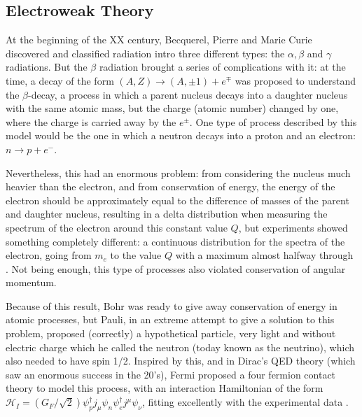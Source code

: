 
\subsection{Electroweak Theory} \label{EWT}

At the beginning of the XX century, Becquerel, Pierre and Marie Curie discovered and classified radiation intro three different types: the $\alpha, \beta$ and $\gamma$ radiations. But the $\beta$ radiation brought a series of complications with it: at the time, a decay of the form $(A, Z) \rightarrow (A, \pm 1) + e^{\mp}$ \cite{Haxton} was proposed to understand the $\beta$-decay,  a process in which a parent nucleus decays into a daughter nucleus with the same atomic mass, but the charge (atomic number) changed by one, where the charge is carried away by the $e^{\pm}$. One type of process described by this model would be the one in which a neutron decays into a proton and an electron: $n \rightarrow p + e^-$. 

Nevertheless, this had an enormous problem: from considering the nucleus much heavier than the electron, and from conservation of energy, the energy of the electron should be approximately equal to the difference of masses of the parent and daughter nucleus, resulting in a delta distribution when measuring the spectrum of the electron around this constant value $Q$, but experiments showed something completely different: a continuous distribution for the spectra of the electron, going from $m_e$ to the value $Q$ with a maximum almost halfway through \cite{Haxton}. Not being enough, this type of processes also violated conservation of angular momentum.

Because of this result, Bohr was ready to give away conservation of energy in atomic processes, but Pauli, in an extreme attempt to give a solution to this problem, proposed (correctly) a hypothetical particle, very light and without electric charge which he called the neutron (today known as the neutrino), which also needed to have spin 1/2. Inspired by this, and in Dirac's QED theory (which saw an enormous success in the 20's), Fermi proposed a four fermion contact theory to model this process, with an interaction Hamiltonian of the form $\mathcal{H}_I = (G_F/\sqrt{2})\psi^{\dagger}_pj_{\mu}\psi_n\psi^{\dagger}_ej^{\mu}\psi_{\nu}$, fitting excellently with the experimental data \cite{Griffiths}\cite{Haxton}.

